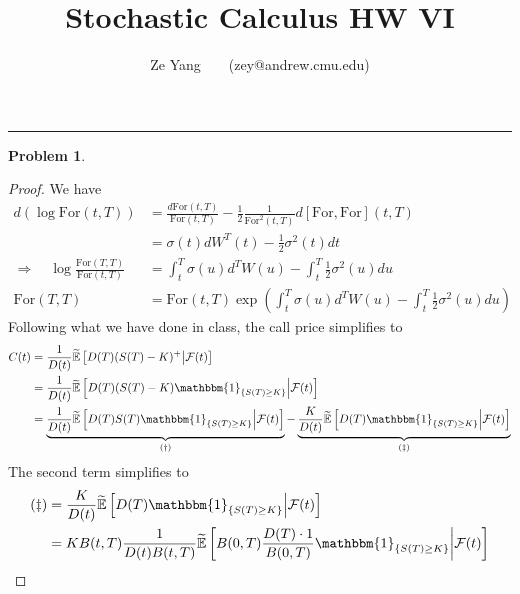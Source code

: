 \documentclass[a4paper, 10pt]{article}
\title{\textbf{Stochastic Calculus HW VI}}
\author{Ze Yang~~~~(zey@andrew.cmu.edu)}
\theoremstyle{definition}
\newtheorem{problem}{Problem}
\theoremstyle{hSol}
\begin{document}
\maketitle



\noindent\rule{16cm}{0.4pt}
\begin{problem} 
\end{problem}
\begin{proof} We have
\begin{equation}
  \begin{split}\label{forTT}
    d(\log \text{For}(t,T)) &= \frac{d\text{For}(t,T)}{\text{For}(t,T)} - \frac{1}{2}\frac{1}{\text{For}^2(t,T)}d[\text{For}, \text{For}](t,T) \\
    &=\sigma(t)dW^T(t) - \frac{1}{2}\sigma^2(t)dt\\
    \Rightarrow\quad \log \frac{\text{For}(T,T)}{\text{For}(t,T)} &= \int_t^T \sigma(u)d^TW(u) - \int_t^T \frac{1}{2}\sigma^2(u)du \\
    \text{For}(T,T) &= \text{For}(t,T)\exp\left(\int_t^T \sigma(u)d^TW(u) - \int_t^T \frac{1}{2}\sigma^2(u)du\right)
  \end{split}
\end{equation}
Following what we have done in class, the call price simplifies to
\begin{equation}
  \begin{split}
    C(t) &= \frac{1}{D(t)} \widetilde{\mathbb{E}}\left[D(T)(S(T)-K)^+\middle|\mathcal{F}(t)\right] \\
    &= \frac{1}{D(t)} \widetilde{\mathbb{E}}\left[D(T)(S(T)-K) \mathbbm{1}_{\{S(T)\geq K\}}\middle|\mathcal{F}(t)\right]\\
    &= \underbrace{\frac{1}{D(t)} \widetilde{\mathbb{E}}\left[D(T)S(T) \mathbbm{1}_{\{S(T)\geq K\}}\middle|\mathcal{F}(t)\right]}_{(\dag)}-\underbrace{\frac{K}{D(t)} \widetilde{\mathbb{E}}\left[D(T) \mathbbm{1}_{\{S(T)\geq K\}}\middle|\mathcal{F}(t)\right]}_{(\ddag)}
  \end{split}
\end{equation}
The second term simplifies to
\begin{equation}
  \begin{split}
    (\ddag) &= \frac{K}{D(t)} \widetilde{\mathbb{E}}\left[D(T) \mathbbm{1}_{\{S(T)\geq K\}}\middle|\mathcal{F}(t)\right] \\
    &= KB(t,T)\frac{1}{D(t)B(t,T)} \widetilde{\mathbb{E}}\left[B(0,T)\frac{D(T)\cdot 1}{B(0,T)} \mathbbm{1}_{\{S(T)\geq K\}}\middle|\mathcal{F}(t)\right]\\

\end{split}
\end{equation}
\end{proof}
\end{document}
